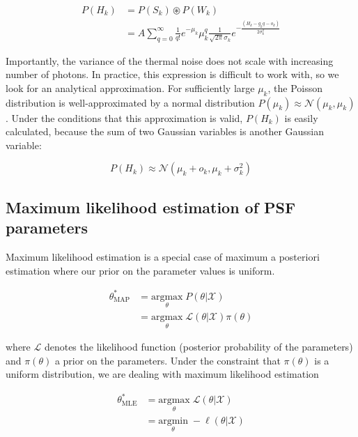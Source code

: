 \documentclass{ucetd}
\begin{document}
\begin{align*}
P(H_{k}) &= P(S_{k})\circledast P(W_{k})\\
&= A\sum_{q=0}^{\infty} \frac{1}{q!}e^{-\mu_{k}}\mu_{k}^{q}\frac{1}{\sqrt{2\pi}\sigma_{k}}e^{-\frac{(H_{k}-g_{k}q-o_{k})}{2\sigma_{k}^{2}}}
\end{align*}

Importantly, the variance of the thermal noise does not scale with increasing number of photons. In practice, this expression is difficult to work with, so we look for an analytical approximation. For sufficiently large $\mu_{k}$, the Poisson distribution is well-approximated by a normal distribution $P(\mu_{k}) \approx \mathcal{N}(\mu_{k},\mu_{k})$. Under the conditions that this approximation is valid, $P(H_{k})$ is easily calculated, because the sum of two Gaussian variables is another Gaussian variable:

\begin{equation*}
P(H_{k}) \approx \mathcal{N}(\mu_{k}+o_{k}, \mu_{k}+\sigma_{k}^{2})
\end{equation*}




\subsection{Maximum likelihood estimation of PSF parameters}

Maximum likelihood estimation is a special case of maximum a posteriori estimation where our prior on the parameter values is uniform.

\begin{align*}
\theta^{*}_{\mathrm{MAP}} &= \underset{\theta}{\mathrm{argmax}} \;P(\theta|\mathcal{X})\\
&= \underset{\theta}{\mathrm{argmax}} \; \mathcal{L}(\theta|\mathcal{X})\pi(\theta)
\end{align*}


where $\mathcal{L}$ denotes the likelihood function (posterior probability of the parameters) and $\pi(\theta)$ a prior on the parameters. Under the constraint that $\pi(\theta)$ is a uniform distribution, we are dealing with maximum likelihood estimation

\begin{align*}
\theta^{*}_{\mathrm{MLE}} &= \underset{\theta}{\mathrm{argmax}} \;\mathcal{L}(\theta|\mathcal{X})\\
&= \underset{\theta}{\mathrm{argmin}} \; -\ell(\theta|\mathcal{X})
\end{align*}
\end{document}
